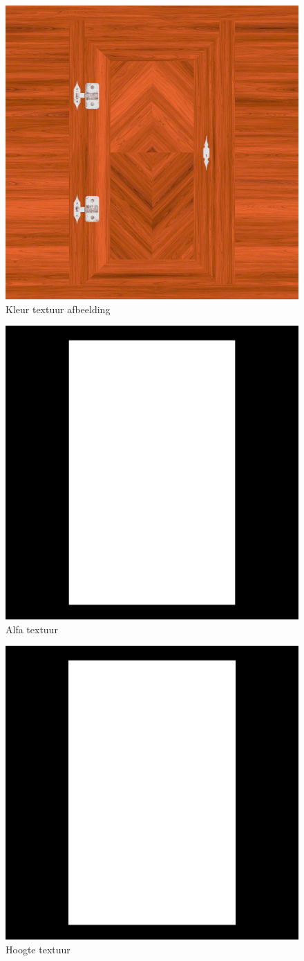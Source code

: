 \begin{figure}[]
	\centering
	\includegraphics[width=.5\linewidth]{graphics/colorTexture}
	\caption[Kleur textuur afbeelding]{Kleur textuur afbeelding}
	\label{fig:colorTexture}
\end{figure}
\begin{figure}[]
	\centering
	\includegraphics[width=.5\linewidth]{graphics/alphaTexture}
	\caption[Alfa textuur]{Alfa textuur}
	\label{fig:alphaTexture}
\end{figure}
\begin{figure}[]
	\centering
	\includegraphics[width=.5\linewidth]{graphics/heightTexture}
	\caption[Hoogte textuur]{Hoogte textuur}
	\label{fig:heightTexture}
\end{figure}
